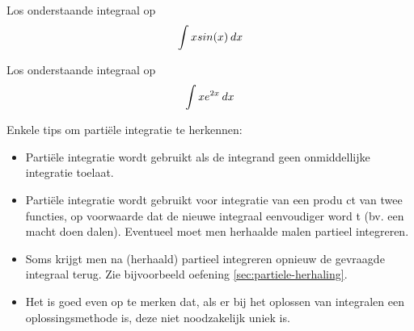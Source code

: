 \begin{exercise}
	Los onderstaande integraal op
	\[ \int  x sin(x)\hspace{2pt}dx \]
	\iftoggle{solution}{%
		Stel $u(x) = x $ en $u'(x) = 1$ en stel $v'(x) = sin(x)$ zodat $v(x) = -cos(x)$. 
		Parti\"ele integratie geeft dan
		
		\[ \int x sin(x)\dx = -xcos(x) +   \int cos(x)\dx  = -xcos(x)+sin(x)+ C , C \in \mathbb{R}\]
	}{%
	}	
	
\end{exercise}

\begin{exercise}
	Los onderstaande integraal op
	\[ \int  xe^{2x}\hspace{2pt}dx \]
	\iftoggle{solution}{%
		Stel $u(x) = x $ en $u'(x) = 1$ en stel $v'(x) = e^{2x}$ zodat $v(x) = \frac{1}{2}e^{2x}$. 
		Parti\"ele integratie geeft dan
		
		\[ \int xe^{2x}\dx = \frac{xe^{2x}}{2} -   \int \frac{1}{2}e^{2x}\dx  = 3x^3ln(x) - x^3+ C , C \in \mathbb{R}\]
		\[ \int xe^{2x}\dx = \frac{xe^{2x}}{2} - \frac{1}{4}\int e^{2x}d2x = \frac{xe^{2x}}{2} - \frac{1}{4}e^{2x}+ C , C \in \mathbb{R} \]
	}{%
	}	
	
\end{exercise}

Enkele tips om parti\"ele integratie te herkennen:
\begin{itemize}
	\item Parti\"ele integratie wordt gebruikt als de integrand geen onmiddellijke integratie toelaat.
	\item Parti\"ele integratie wordt gebruikt voor integratie van een produ
	ct van twee functies, op voorwaarde dat de nieuwe integraal eenvoudiger word
	t (bv. een macht doen dalen). Eventueel moet men herhaalde malen partieel integreren.
	\item Soms krijgt men na (herhaald) partieel integreren opnieuw de gevraagde integraal terug. Zie bijvoorbeeld oefening \ref{sec:partiele-herhaling}.
	\item Het is goed even op te merken dat, als er bij het oplossen van integralen een oplossingsmethode is, deze niet noodzakelijk uniek is. 
\end{itemize}

